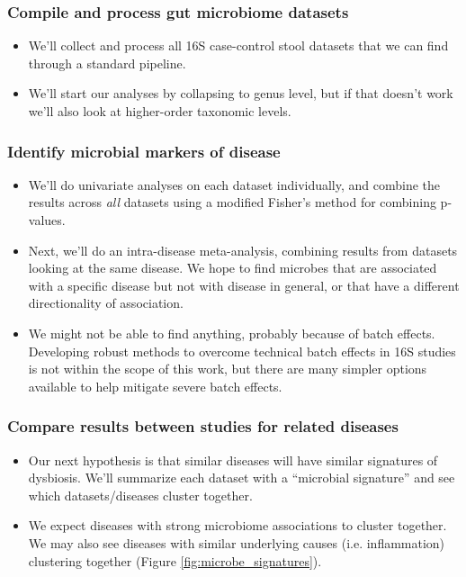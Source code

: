 \documentclass[12pt]{article}
\begin{document}
\subsubsection{Compile and process gut microbiome datasets}

\begin{itemize}
\item We'll collect and process all 16S case-control stool datasets that we can find through a standard pipeline.
\item We'll start our analyses by collapsing to genus level, but if that doesn't work we'll also look at higher-order taxonomic levels.
\end{itemize}

\subsubsection{Identify microbial markers of disease}\label{sec:indep_studies}

\begin{itemize}
\item We'll do univariate analyses on each dataset individually, and combine the results across \textit{all} datasets using a modified Fisher's method for combining p-values.
\item Next, we'll do an intra-disease meta-analysis, combining results from datasets looking at the same disease. We hope to find microbes that are associated with a specific disease but not with disease in general, or that have a different directionality of association.
\item We might not be able to find anything, probably because of batch effects. Developing robust methods to overcome technical batch effects in 16S 
studies is not within the scope of this work, but there are many
simpler options available to help mitigate severe batch effects.
\end{itemize}

\subsubsection{Compare results between studies for related diseases}\label{sec:signatures}
\begin{itemize}
\item Our next hypothesis is that similar diseases will have similar 
signatures of dysbiosis. We'll summarize each dataset with a ``microbial signature'' and see which datasets/diseases cluster together.
\item We expect diseases with strong microbiome associations to cluster together. We may also see diseases with similar underlying causes (i.e. inflammation) clustering together (Figure \ref{fig:microbe_signatures}).
\end{itemize}
\end{document}
